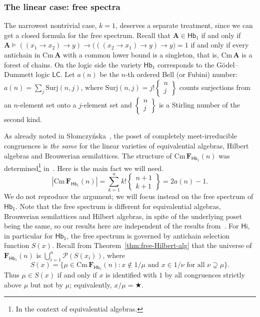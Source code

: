 \documentclass{amsart}
\newcommand{\alg}[1]{\mathbf{#1}}
\newcommand{\var}[1]{\mathsf{#1}}
\newcommand{\cm}[1]{\mathrm{Cm}\, #1}
\def\ra{\rightarrow}
\def\pw{\mathscr{P}}
\def\op{\bigstar}
\begin{document}
\subsubsection{The linear case: free spectra}\label{ssec:width-one}
 
The narrowest nontrivial case, $k=1$, deserves a separate treatment, since we
can get a closed formula for the free spectrum. Recall that 
$\alg{A}\in\var{Hb}_1$ if and only if
$\alg{A}\models
((x_1\ra x_2)\ra y) \ra \bigl(((x_2\ra x_1)\ra y) \ra y\bigr) = 1$
if and only if every antichain in $\cm{\alg{A}}$ with a
common lower 
bound is a singleton, that is, $\cm{\alg{A}}$ is a forest of chains. On the
logic side the variety $\var{Hb}_1$ corresponds to the G\"odel--Dummett logic
$\mathsf{LC}$.
Let $a(n)$ be the $n$-th ordered Bell (or Fubini)
number: $a(n)=\sum_{j}\mathrm{Surj}(n,j)$, where
$\mathrm{Surj}(n,j)=j!\begin{Bmatrix}n\\ j\end{Bmatrix}$
counts surjections from an $n$-element set onto a $j$-element set
and $\begin{Bmatrix}n\\ j\end{Bmatrix}$ is
a Stirling number of the second kind.

As already noted in Słomczyńska~\cite{Slo05}, the poset of completely
meet-irreducible congruences is \emph{the same} for the linear varieties of
equivalential algebras, Hilbert algebras and Brouwerian semilattices.
The structure of $\cm{\alg{F}_{\var{Hb}_1}(n)}$ 
was determined\footnote{In the context of
  equivalential algebras.} in~\cite{Slo05}. Here is the
main fact we will need. 
\begin{equation}\label{eq:w1-poset}\tag{\ddag}
|\cm{\alg{F}_{\var{Hb}_1}(n)}| =
\sum_{k=1}^{n} k!\begin{Bmatrix}n+1\\ k+1\end{Bmatrix} = 2a(n)-1.
\end{equation}
We do not reproduce the argument; we will focus instead on the
free spectrum of $\var{Hb_1}$. Note that the free spectrum
is different for equivalential algebras, Brouwerian semilattices and Hilbert
algebras, in spite of the underlying poset being the same, so our results
here are independent of the results from~\cite{Slo05}.
For $\var{Hi}$, in particular for $\var{Hb_1}$, the free spectrum is governed
by antichain selection function $S(x)$.   
Recall from Theorem~\ref{thm:free-Hilbert-alg} that the universe of 
$\alg{F}_{\var{Hb}_1}(n)$ is $\bigcup_{i=1}^{n}\pw(S(x_i))$,
where
\[
  S(x)=\{\mu\in \cm\alg{F}_{\var{Hb}_1}(n):
  x\notin 1/\mu \text{ and } x\in 1/\nu \text{ for all }
  \nu\supsetneq\mu\}. 
\] 
Thus $\mu\in S(x)$ if and only if $x$ is identified with $1$ by all congruences
strictly above $\mu$ but not by $\mu$; equivalently, $x/\mu = \op$.
\end{document}
